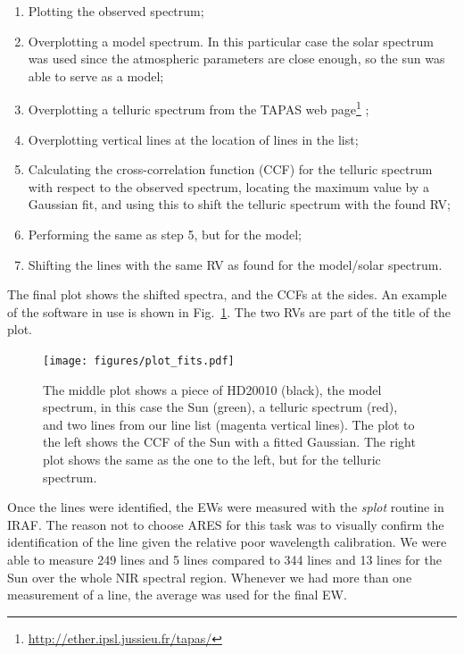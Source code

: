 \documentclass{aa}
\begin{document}
\begin{enumerate}
    \item Plotting the observed spectrum;
    \item Overplotting a model spectrum. In this particular case the solar spectrum was
        used since the atmospheric parameters are close enough, so the sun was able to
        serve as a model;
    \item Overplotting a telluric spectrum from the TAPAS web
          page\footnote{\url{http://ether.ipsl.jussieu.fr/tapas/}} \citep{Bertaux2014};
    \item Overplotting vertical lines at the location of lines in the list;
    \item Calculating the cross-correlation function (CCF) for the telluric spectrum
        with respect to the observed spectrum, locating the maximum value by a Gaussian fit,
        and using this to shift the telluric spectrum with the found RV;
    \item Performing the same as  step 5, but for the model;
    \item Shifting the lines with the same RV as found for the model/solar spectrum.
\end{enumerate}
The final plot shows the shifted spectra, and the CCFs at the sides. An
example of the software in use is shown in Fig.~\ref{fig:plot_fits}. The
two RVs are part of the title of the plot.

\begin{figure}[tbp!]
    \centering
    \texttt{[image: figures/plot\_fits.pdf]}
    \caption{The middle plot shows a piece of HD20010 (black), the model
    spectrum, in this case the Sun (green), a telluric spectrum (red),
    and two lines from our line list (magenta vertical lines). The
    plot to the left shows the CCF of the Sun with a fitted Gaussian.
    The right plot shows the same as the one to the left, but for the
    telluric spectrum.}
    \label{fig:plot_fits}
\end{figure}

Once the lines were identified, the EWs were measured with the
\emph{splot} routine in IRAF. The reason not to choose ARES for this
task was to visually confirm the identification of the line given the
relative poor wavelength calibration. We were able to measure 249
 lines and 5  lines compared to 344 
lines and 13  lines for the Sun over the whole NIR spectral
region. Whenever we had more than one measurement of a line, the average
was used for the final EW.
\end{document}
